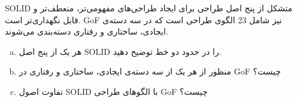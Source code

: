 SOLID
متشکل از پنج اصل طراحی برای ایجاد طراحی‌های مفهومی‌تر، منعطف‌تر و قابل نگهداری‌تر است. GoF نیز شامل 23 الگوی طراحی است که در سه دسته‌ی ایجادی، ساختاری و رفتاری دسته‌بندی می‌شوند. 


\begin{enumerate}[a)]
	\item
هر یک از پنج اصل SOLID را در حدود دو خط توضیح دهید.
	\item
 منظور از هر یک از سه دسته‌ی ایجادی، ساختاری و رفتاری در GoF چیست؟
 	\item
تفاوت اصول SOLID با الگوهای طراحی GoF چیست؟
\end{enumerate}


